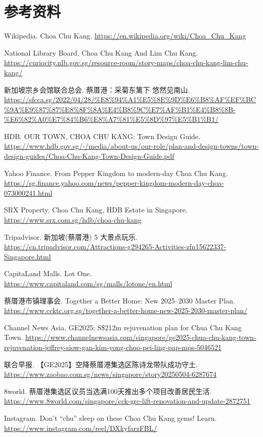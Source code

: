 \documentclass[11pt,a4paper,twoside,openany]{book}
\begin{document}
\section*{参考资料}
\begin{enumerate}[label={[\arabic*]},leftmargin=*,topsep=2pt,itemsep=1pt,parsep=0pt]
  \item Wikipedia. Choa Chu Kang. \url{https://en.wikipedia.org/wiki/Choa_Chu_Kang}
  \item National Library Board. Choa Chu Kang And Lim Chu Kang. \url{https://curiocity.nlb.gov.sg/resource-room/story-maps/choa-chu-kang-lim-chu-kang/}
  \item 新加坡宗乡会馆联合总会. 蔡厝港：采菊东篱下 悠然见南山. \url{https://sfcca.sg/2022/04/28/%E8%94%A1%E5%8E%9D%E6%B8%AF%EF%BC%9A%E9%87%87%E8%8F%8A%E4%B8%9C%E7%AF%B1%E4%B8%8B-%E6%82%A0%E7%84%B6%E8%A7%81%E5%8D%97%E5%B1%B1/}
  \item HDB. OUR TOWN, CHOA CHU KANG: Town Design Guide. \url{https://www.hdb.gov.sg/-/media/about-us/our-role/plan-and-design-towns/town-design-guides/Choa-Chu-Kang-Town-Design-Guide.pdf}
  \item Yahoo Finance. From Pepper Kingdom to modern-day Choa Chu Kang. \url{https://sg.finance.yahoo.com/news/pepper-kingdom-modern-day-choa-073000241.html}
  \item SRX Property. Choa Chu Kang, HDB Estate in Singapore. \url{https://www.srx.com.sg/hdb/choa-chu-kang}
  \item Tripadvisor. 新加坡(蔡厝港) 5 大景点玩乐. \url{https://cn.tripadvisor.com/Attractions-g294265-Activities-zfn15622337-Singapore.html}
  \item CapitaLand Malls. Lot One. \url{https://www.capitaland.com/sg/malls/lotone/en.html}
  \item 蔡厝港市镇理事会. Together a Better Home: New 2025–2030 Master Plan. \url{https://www.ccktc.org.sg/together-a-better-home-new-2025-2030-master-plan/}
  \item Channel News Asia. GE2025: S\$212m rejuvenation plan for Chua Chu Kang Town. \url{https://www.channelnewsasia.com/singapore/ge2025-chua-chu-kang-town-rejuvenation-jeffrey-siow-gan-kim-yong-choo-pei-ling-pap-mps-5046521}
  \item 联合早报. 【GE2025】空降蔡厝港集选区陈诗龙带队成功守土. \url{https://www.zaobao.com.sg/news/singapore/story20250504-6287674}
  \item 8world. 蔡厝港集选区议员当选满100天推出多个项目改善居民生活. \url{https://www.8world.com/singapore/cck-grc-lift-renovation-and-update-2872751}
  \item Instagram. Don't “chu” sleep on these Choa Chu Kang gems! Learn. \url{https://www.instagram.com/reel/DXkyfarzFBL/}
\end{enumerate}
\end{document}
